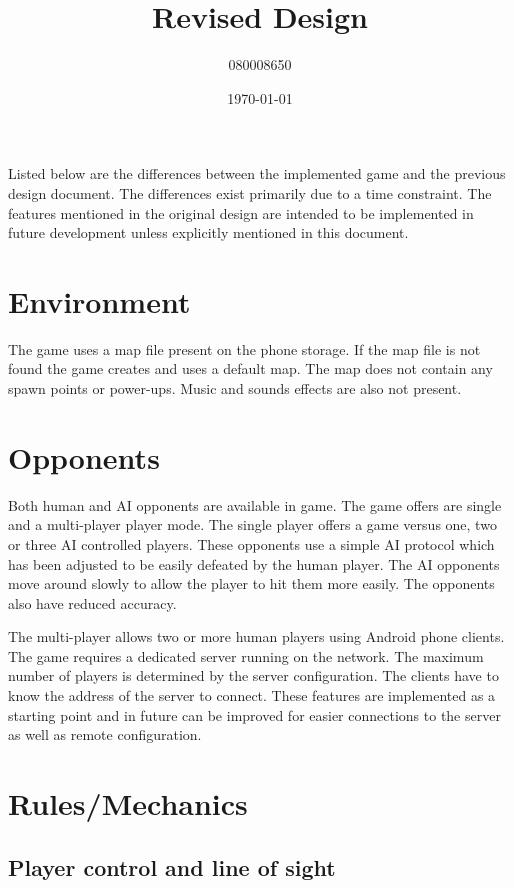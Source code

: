 \documentclass[11pt]{article} %
\title{Revised Design}
\author{080008650}
\date{\today} %
\begin{document}
\maketitle

Listed below are the differences between the implemented game and the previous design document. The differences exist primarily due to a time constraint. The features mentioned in the original design are intended to be implemented in future development unless explicitly mentioned in this document.

\section*{Environment}

The game uses a map file present on the phone storage. If the map file is not found the game creates  and uses a default map. The map does not contain any spawn points or power-ups. Music and sounds effects are also not present.

\section*{Opponents}

Both human and AI opponents are available in game. The game offers are single and a multi-player player mode. The single player offers a game versus one, two or three AI controlled players. These opponents use a simple AI protocol which has been adjusted to be easily defeated by the human player. The AI opponents move around slowly to allow the player to hit them more easily. The opponents also have reduced accuracy.

The multi-player allows two or more human players using Android phone clients. The game requires a dedicated server running on the network. The maximum number of players is determined by the server configuration. The clients have to know the address of the server to connect. These features are implemented as a starting point and in future can be improved  for easier connections to the server as well as remote configuration.

\section*{Rules/Mechanics}

\subsection*{Player control and line of sight}
\end{document}
